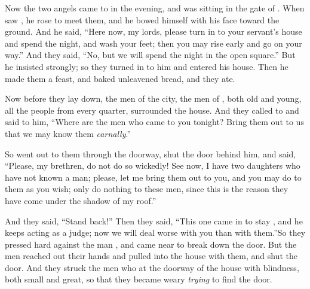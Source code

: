 
\bverse Now the two angels came to  in the evening, and  was sitting in the gate of . When  saw \them, he rose to meet them, and he bowed himself with his face toward the ground.
\bverse And he said, ``Here now, my lords, please turn in to your servant's house and spend the night, and wash your feet; then you may rise early and go on your way.'' And they said, ``No, but we will spend the night in the open square.''
\bverse But he insisted strongly; so they turned in to him and entered his house. Then he made them a feast, and baked unleavened bread, and they ate.

\bverse Now before they lay down, the men of the city, the men of , both old and young, all the people from every quarter, surrounded the house.
\bverse And they called to  and said to him, ``Where are the men who came to you tonight? Bring them out to us that we may know them \textit{carnally}.''

\bverse So  went out to them through the doorway, shut the door behind him, 
\bverse and said, ``Please, my brethren, do not do so wickedly! 
\bverse See now, I have two daughters who have not known a man; please, let me bring them out to you, and you may do to them as you wish; only do nothing to these men, since this is the reason they have come under the shadow of my roof.''

\bverse And they said, ``Stand back!'' Then they said, ``This one came in to stay \here, and he keeps acting as a judge; now we will deal worse with you than with them.''So they pressed hard against the man , and came near to break down the door.
\bverse But the men reached out their hands and pulled  into the house with them, and shut the door.
\bverse And they struck the men who \were at the doorway of the house with blindness, both small and great, so that they became weary \textit{trying} to find the door.

